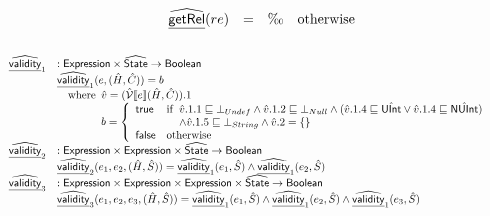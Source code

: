 \documentclass{article}
\newcommand{\lbr}{\ensuremath{\llbracket}}
\newcommand{\rbr}{\ensuremath{\rrbracket}}
\newcommand{\ifc}[1]{{\rm if}\begin{array}[t]{l}#1\end{array}}
\newcommand{\SF}[1]{\mbox{\textsf{#1}}}
\newcommand{\wherec}[1]{{\rm where}\begin{array}[t]{l}#1\end{array}}
\newcommand{\owc}{{\rm otherwise}}
\newcommand{\abs}[1]{\widehat{\SF{#1}}}
\newcommand{\aState}{\abs{State}}
\newcommand{\V}{\mathcal{V}}
\newcommand{\aV}{\hat{\mathcal{V}}}
\newcommand{\ahf}[1]{\widehat{\underline{\sf #1}}}
\newcommand{\vtrue}{\SF{true}}
\newcommand{\vfalse}{\SF{false}}
\begin{document}
\[\begin{array}{ll}

& \begin{array}{lll}
  \ahf{getRel}(re) &=& \O \quad\owc
\end{array}\\\\

\end{array}
\]
\[
\begin{array}{ll}

\ahf{validity}_1 & : \sf{Expression} \times \aState \rightarrow {\sf Boolean}\\
& \ahf{validity}_1(e, (\hat{H}, \hat{C})) = b\\
& \quad\wherec {
  \hat{v} = (\aV \lbr e \rbr (\hat{H}, \hat{C})).1\\
  b = \left\{
    \begin{array}{ll}
      \vtrue & 
        \ifc{ \hat{v}.1.1 \sqsubseteq \bot_{Undef} \land \hat{v}.1.2 \sqsubseteq \bot_{Null} \land (\hat{v}.1.4 \sqsubseteq \hat{\sf UInt} \lor \hat{v}.1.4 \sqsubseteq \hat{\sf NUInt})\\
           \land \hat{v}.1.5 \sqsubseteq \bot_{String} \land \hat{v}.2 = \{\} }\\
      \vfalse & \owc
    \end{array}
  \right.
}\\

\ahf{validity}_2 & : \sf{Expression} \times \sf{Expression} \times \aState \rightarrow {\sf Boolean}\\
& \ahf{validity}_2(e_1, e_2, (\hat{H}, \hat{S})) = \ahf{validity}_1(e_1, \hat{S}) \land \ahf{validity}_1(e_2, \hat{S})\\

\ahf{validity}_3 & : \sf{Expression} \times \sf{Expression} \times \sf{Expression} \times \aState \rightarrow {\sf Boolean}\\
& \ahf{validity}_3(e_1, e_2, e_3, (\hat{H}, \hat{S})) = \ahf{validity}_1(e_1, \hat{S}) \land \ahf{validity}_1(e_2, \hat{S}) \land \ahf{validity}_1(e_3, \hat{S})\\


  \end{array}
\]
\end{document}
